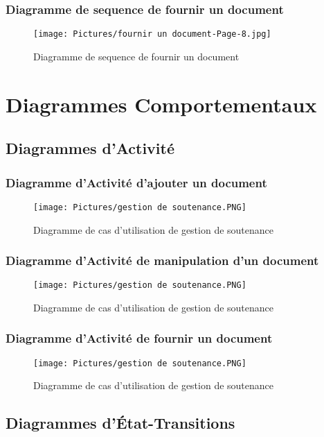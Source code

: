 \documentclass[11pt,fleqn]{book} %
\begin{document}
\subsubsection{Diagramme de sequence de fournir un document}
\begin{figure}[h]
    \centering
    \texttt{[image: Pictures/fournir un document-Page-8.jpg]}
    \caption{Diagramme de sequence de fournir un document}
    \label{fig:pca}
\end{figure}
\newpage
\section{Diagrammes Comportementaux}
\subsection{Diagrammes d’Activité}
\subsubsection{Diagramme d’Activité d'ajouter un document}
\begin{figure}[h]
    \centering
    \texttt{[image: Pictures/gestion de soutenance.PNG]}
    \caption{Diagramme de cas d'utilisation de gestion de soutenance}
    \label{fig:pca}
\end{figure}
\newpage
\subsubsection{Diagramme d’Activité de manipulation d'un document}
\begin{figure}[h]
    \centering
    \texttt{[image: Pictures/gestion de soutenance.PNG]}
    \caption{Diagramme de cas d'utilisation de gestion de soutenance}
    \label{fig:pca}
\end{figure}
\newpage
\subsubsection{Diagramme d’Activité de fournir un document}
\begin{figure}[h]
    \centering
    \texttt{[image: Pictures/gestion de soutenance.PNG]}
    \caption{Diagramme de cas d'utilisation de gestion de soutenance}
    \label{fig:pca}
\end{figure}
\newpage
\subsection{Diagrammes d’État-Transitions}
\end{document}
